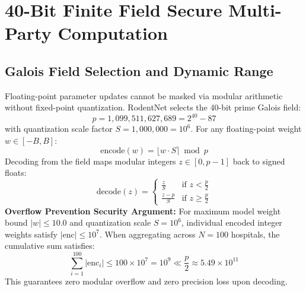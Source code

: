 \documentclass[11pt,a4paper]{report}
\begin{document}
\section{40-Bit Finite Field Secure Multi-Party Computation}

\subsection{Galois Field Selection and Dynamic Range}
Floating-point parameter updates cannot be masked via modular arithmetic without fixed-point quantization. RodentNet selects the 40-bit prime Galois field:
\begin{equation}
p = 1{,}099{,}511{,}627{,}689 = 2^{40} - 87
\end{equation}
with quantization scale factor $S = 1{,}000{,}000 = 10^6$. For any floating-point weight $w \in [-B, B]$:
\begin{equation}
\text{encode}(w) = \lfloor w \cdot S \rceil \bmod p
\end{equation}
Decoding from the field maps modular integers $z \in [0, p-1]$ back to signed floats:
\begin{equation}
\text{decode}(z) = \begin{cases}
\frac{z}{S} & \text{if } z < \frac{p}{2} \\
\frac{z - p}{S} & \text{if } z \ge \frac{p}{2}
\end{cases}
\end{equation}
\noindent\textbf{Overflow Prevention Security Argument:} For maximum model weight bound $|w| \le 10.0$ and quantization scale $S = 10^6$, individual encoded integer weights satisfy $|\text{enc}| \le 10^7$. When aggregating across $N = 100$ hospitals, the cumulative sum satisfies:
\begin{equation}
\sum_{i=1}^{100} |\text{enc}_i| \le 100 \times 10^7 = 10^9 \ll \frac{p}{2} \approx 5.49 \times 10^{11}
\end{equation}
This guarantees zero modular overflow and zero precision loss upon decoding.
\end{document}
